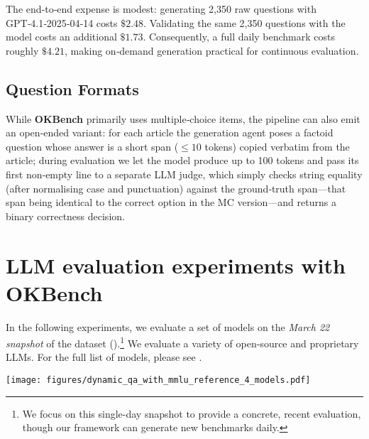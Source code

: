 \documentclass[11pt]{article}
\newcommand{\name}{{\textbf{OKBench}}}
\begin{document}
The end‑to‑end expense is modest: generating 2{,}350 raw questions with GPT‑4.1‑2025‑04‑14 costs \(\$2.48\). Validating the same 2{,}350 questions with the model costs an additional \(\$1.73\). Consequently, a full daily benchmark costs roughly \(\$4.21\), making on‑demand generation practical for continuous evaluation.

\subsection{Question Formats}
\label{subsec:question-format}

While \name{} primarily uses multiple‑choice items, the pipeline can also emit an open‑ended variant: for each article the generation agent poses a factoid question whose answer is a short span (\(\le\!10\) tokens) copied verbatim from the article; during evaluation we let the model produce up to 100 tokens and pass its first non‑empty line to a separate LLM judge, which simply checks string equality (after normalising case and punctuation) against the ground‑truth span—that span being identical to the correct option in the MC version—and returns a binary correctness decision.
 

\section{LLM evaluation experiments with \name}
\label{sec:experimental-setup}
In the following experiments, we evaluate a set of models on the \emph{March 22 snapshot} of the dataset
().\footnote{We focus on this single-day snapshot to provide a concrete, recent evaluation,
though our framework can generate new benchmarks daily. } We evaluate a variety of open-source and proprietary LLMs. For the full list of models, please see .

\begin{figure*}[ht]
    \centering
    \texttt{[image: figures/dynamic\_qa\_with\_mmlu\_reference\_4\_models.pdf]}
    \caption{\textbf{No context vs.\ Oracle context QA Accuracy on \name}, plotted alongside each model's performance on MMLU Pro (lighter lines) as a reference for memorized knowledge.
    We show three representative model families (Gemma, Llama, Qwen) at various parameter scales (Billion Parameters). 
    Solid lines denote \emph{No context} accuracy (fresh knowledge), and dashed lines denote \emph{Oracle context} accuracy when the ground-truth article is provided. }
    \label{fig:three_panel_accuracy}
\end{figure*}
\end{document}
